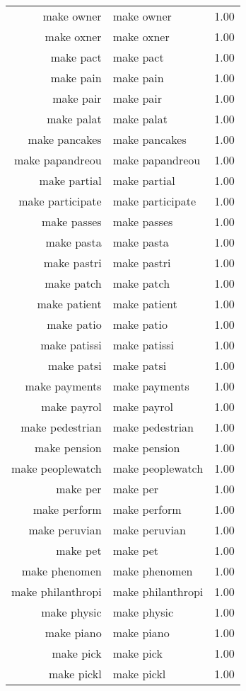 \begin{table}[ht]
\begin{tabular}{rlr}
  make owner & make owner & 1.00 \\ 
  make oxner & make oxner & 1.00 \\ 
  make pact & make pact & 1.00 \\ 
  make pain & make pain & 1.00 \\ 
  make pair & make pair & 1.00 \\ 
  make palat & make palat & 1.00 \\ 
  make pancakes & make pancakes & 1.00 \\ 
  make papandreou & make papandreou & 1.00 \\ 
  make partial & make partial & 1.00 \\ 
  make participate & make participate & 1.00 \\ 
  make passes & make passes & 1.00 \\ 
  make pasta & make pasta & 1.00 \\ 
  make pastri & make pastri & 1.00 \\ 
  make patch & make patch & 1.00 \\ 
  make patient & make patient & 1.00 \\ 
  make patio & make patio & 1.00 \\ 
  make patissi & make patissi & 1.00 \\ 
  make patsi & make patsi & 1.00 \\ 
  make payments & make payments & 1.00 \\ 
  make payrol & make payrol & 1.00 \\ 
  make pedestrian & make pedestrian & 1.00 \\ 
  make pension & make pension & 1.00 \\ 
  make peoplewatch & make peoplewatch & 1.00 \\ 
  make per & make per & 1.00 \\ 
  make perform & make perform & 1.00 \\ 
  make peruvian & make peruvian & 1.00 \\ 
  make pet & make pet & 1.00 \\ 
  make phenomen & make phenomen & 1.00 \\ 
  make philanthropi & make philanthropi & 1.00 \\ 
  make physic & make physic & 1.00 \\ 
  make piano & make piano & 1.00 \\ 
  make pick & make pick & 1.00 \\ 
  make pickl & make pickl & 1.00 \\ 

\end{tabular}
\end{table}
